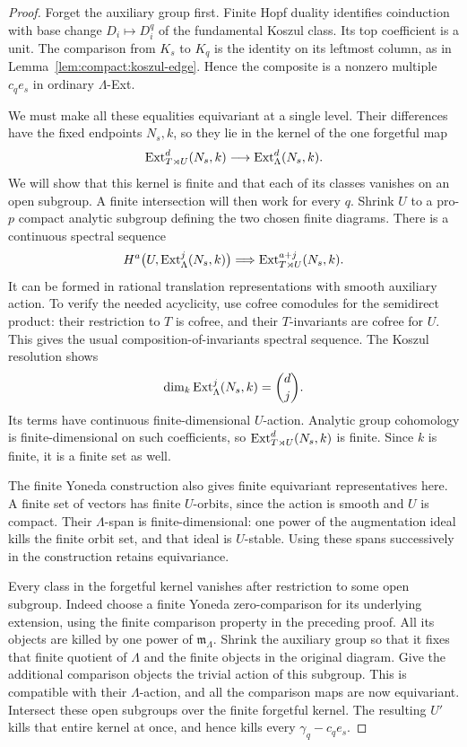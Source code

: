 \begin{proof}
Forget the auxiliary group first.  Finite Hopf duality identifies
coinduction with base change $D_i\mapsto D_i^q$ of the fundamental
Koszul class.  Its top coefficient is a unit.  The comparison from
$K_s$ to $K_q$ is the identity on its leftmost column, as in
Lemma~\ref{lem:compact:koszul-edge}.  Hence the composite is a nonzero
multiple $c_qe_s$ in ordinary $\Lambda$-Ext.

We must make all these equalities equivariant at a single level.
Their differences have the fixed endpoints $N_s,k$, so they lie in
the kernel of the one forgetful map
\[
 \operatorname{Ext}^d_{T\rtimes U}(N_s,k)
       \longrightarrow\operatorname{Ext}^d_\Lambda(N_s,k).
\]
We will show that this kernel is finite and that each of its classes
vanishes on an open subgroup. A finite intersection will then work
for every $q$.
Shrink $U$ to a pro-$p$ compact analytic subgroup defining the two
chosen finite diagrams.  There is a continuous spectral sequence
\[
 H^a\bigl(U,\operatorname{Ext}^j_\Lambda(N_s,k)\bigr)
 \Longrightarrow \operatorname{Ext}^{a+j}_{T\rtimes U}(N_s,k).
\]
It can be formed in rational translation representations with smooth
auxiliary action.  To verify the needed acyclicity, use cofree
comodules for the semidirect product: their restriction to $T$ is
cofree, and their $T$-invariants are cofree for $U$.  This gives the
usual composition-of-invariants spectral sequence.  The Koszul
resolution shows
\[
                  \dim_k\operatorname{Ext}^j_\Lambda(N_s,k)=\binom dj.
\]
Its terms have continuous finite-dimensional $U$-action.  Analytic
group cohomology is finite-dimensional on such coefficients, so
$\operatorname{Ext}^d_{T\rtimes U}(N_s,k)$ is finite.  Since $k$ is finite, it is a
finite set as well.

The finite Yoneda construction also gives finite equivariant
representatives here. A finite set of vectors has finite $U$-orbits,
since the action is smooth and $U$ is compact. Their $\Lambda$-span
is finite-dimensional: one power of the augmentation ideal kills
the finite orbit set, and that ideal is $U$-stable. Using these spans
successively in the construction retains equivariance.

Every class in the forgetful kernel vanishes after restriction to
some open subgroup. Indeed choose a finite Yoneda zero-comparison for its
underlying extension, using the finite comparison property in the
preceding proof.  All its objects are killed by one power of
$\mathfrak m_\Lambda$. Shrink the auxiliary group so that it fixes
that finite quotient of $\Lambda$ and the finite objects in the
original diagram. Give the additional comparison objects the trivial
action of this subgroup. This is compatible with their $\Lambda$-action,
and all the comparison maps are now equivariant. Intersect these open subgroups
over the finite forgetful kernel.  The resulting $U'$ kills that
entire kernel at once, and hence kills every
$\gamma_q-c_qe_s$.


\end{proof}
